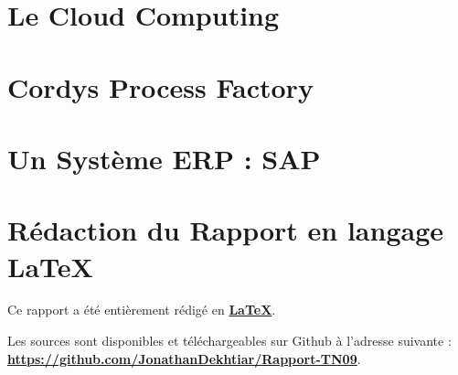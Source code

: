 \documentclass[12pt,a4paper,utf8x, combine]{report}
\begin{document}



\tableofcontents
\listoffigures
\clearpage










\chapter{Le Cloud Computing}


\clearpage

\chapter{Cordys Process Factory}



\clearpage

\chapter{Un Système ERP : SAP}





\clearpage




\nocite{*}
%

%
%

% 

\printindex

\appendix

\pagebreak

\chapter*{Rédaction du Rapport en langage LaTeX}
Ce rapport a été entièrement rédigé en \href{http://fr.wikipedia.org/wiki/LaTeX}{\textbf{LaTeX}}. 

Les sources sont disponibles et téléchargeables sur Github à l'adresse suivante :\\
\href{https://github.com/JonathanDekhtiar/Rapport-TN09}{\textbf{https://github.com/JonathanDekhtiar/Rapport-TN09}}. 
\end{document}
